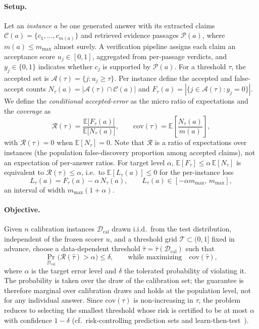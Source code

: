 \documentclass{article}
\begin{document}
\paragraph{Setup.}
Let an \emph{instance} $a$ be one generated answer with its extracted claims
$\mathcal{C}(a)=\{c_1,\dots,c_{m(a)}\}$ and retrieved evidence passages
$\mathcal{P}(a)$, where $m(a)\le m_{\max}$ almost surely. A verification
pipeline assigns each claim an acceptance score $u_j\in[0,1]$, aggregated from
per-passage verdicts, and $y_j\in\{0,1\}$ indicates whether $c_j$ is supported
by $\mathcal{P}(a)$. For a threshold $\tau$, the accepted set is
$\mathcal{A}(\tau)=\{j: u_j\ge\tau\}$. Per instance define the accepted and
false-accept counts $N_\tau(a)=|\mathcal{A}(\tau)\cap\mathcal{C}(a)|$ and
$F_\tau(a)=|\{j\in\mathcal{A}(\tau):y_j=0\}|$. We define the
\emph{conditional accepted-error} as the micro ratio of expectations and the
\emph{coverage} as
\begin{equation}
\mathcal{R}(\tau)=
\frac{\mathbb{E}\big[F_\tau(a)\big]}
     {\mathbb{E}\big[N_\tau(a)\big]},
\qquad
\mathrm{cov}(\tau)=\mathbb{E}\!\left[\frac{N_\tau(a)}{m(a)}\right],
\label{eq:risk}
\end{equation}
with $\mathcal{R}(\tau)=0$ when $\mathbb{E}[N_\tau]=0$. Note that $\mathcal{R}$
is a ratio of expectations over instances (the population
false-discovery proportion among accepted claims), not an expectation of
per-answer ratios. For target level $\alpha$,
$\mathbb{E}[F_\tau]\le\alpha\,\mathbb{E}[N_\tau]$ is equivalent to
$\mathcal{R}(\tau)\le\alpha$, i.e.\ to $\mathbb{E}[L_\tau(a)]\le0$ for the
per-instance loss
\begin{equation}
L_\tau(a)=F_\tau(a)-\alpha\,N_\tau(a),
\qquad L_\tau(a)\in[-\alpha m_{\max},\,m_{\max}],
\label{eq:linear}
\end{equation}
an interval of width $m_{\max}(1+\alpha)$.

\paragraph{Objective.}
Given $n$ calibration instances $\mathcal{D}_{\mathrm{cal}}$ drawn i.i.d.\
from the test distribution, independent of the frozen scorer $u$, and a
threshold grid $\mathcal{T}\subset(0,1]$ fixed in advance, choose a
data-dependent threshold $\hat\tau=\hat\tau(\mathcal{D}_{\mathrm{cal}})$ such
that
\begin{equation}
\Pr_{\mathcal{D}_{\mathrm{cal}}}\!\big(\mathcal{R}(\hat\tau)>\alpha\big)\le\delta,
\qquad\text{while maximizing}\quad \mathrm{cov}(\hat\tau),
\label{eq:objective}
\end{equation}
where $\alpha$ is the target error level and $\delta$ the tolerated
probability of violating it. The probability is taken over the draw of the
calibration set; the guarantee is therefore marginal over calibration
draws and holds at the population level, not for any individual answer.
Since $\mathrm{cov}(\tau)$ is non-increasing in $\tau$, the problem reduces to
selecting the smallest threshold whose risk is certified to be at most
$\alpha$ with confidence $1-\delta$ (cf.\ risk-controlling prediction
sets and learn-then-test~\cite{bates2021rcps,angelopoulos2021ltt}).
\end{document}
